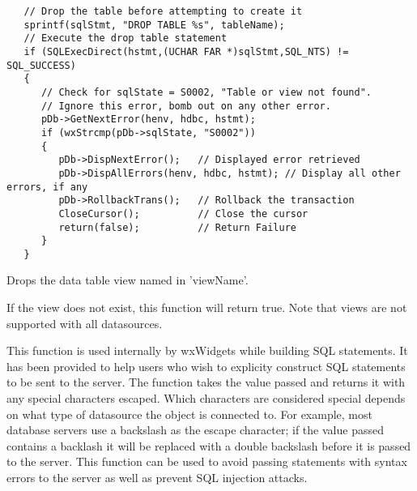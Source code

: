 
\begin{verbatim}
   // Drop the table before attempting to create it
   sprintf(sqlStmt, "DROP TABLE %s", tableName);
   // Execute the drop table statement
   if (SQLExecDirect(hstmt,(UCHAR FAR *)sqlStmt,SQL_NTS) != SQL_SUCCESS)
   {
      // Check for sqlState = S0002, "Table or view not found".
      // Ignore this error, bomb out on any other error.
      pDb->GetNextError(henv, hdbc, hstmt);
      if (wxStrcmp(pDb->sqlState, "S0002"))
      {
         pDb->DispNextError();   // Displayed error retrieved
         pDb->DispAllErrors(henv, hdbc, hstmt); // Display all other errors, if any
         pDb->RollbackTrans();   // Rollback the transaction
         CloseCursor();          // Close the cursor
         return(false);          // Return Failure
      }
   }
\end{verbatim}


\label{wxdbdropview}


Drops the data table view named in 'viewName'.




If the view does not exist, this function will return true.  Note that views are not supported with all datasources.

\label{wxdbescapesqlchars}


This function is used internally by wxWidgets while building SQL statements.
It has been provided to help users who wish to explicity construct SQL
statements to be sent to the server.  The function takes the value passed and
returns it with any special characters escaped.  Which characters are
considered special depends on what type of datasource the object is connected
to.  For example, most database servers use a backslash as the escape
character; if the value passed contains a backlash it will be replaced with a
double backslash before it is passed to the server.  This function can be used
to avoid passing statements with syntax errors to the server as well as prevent
SQL injection attacks.



